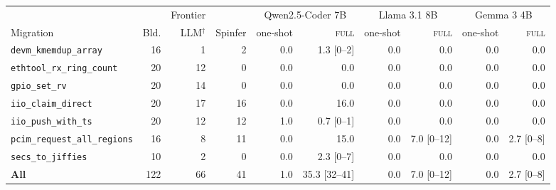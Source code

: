 \begin{tabular}{lrrrrrrrrr}
\toprule
 & & Frontier & & \multicolumn{2}{c}{Qwen2.5-Coder 7B} & \multicolumn{2}{c}{Llama 3.1 8B} & \multicolumn{2}{c}{Gemma 3 4B} \\
\cmidrule(lr){5-6}\cmidrule(lr){7-8}\cmidrule(lr){9-10}
Migration & Bld. & LLM$^\dagger$ & Spinfer & one-shot & \textsc{full} & one-shot & \textsc{full} & one-shot & \textsc{full} \\
\midrule
\texttt{devm\_kmemdup\_array} & 16 & 1 & 2 & 0.0 & 1.3 [0--2] & 0.0 & 0.0 & 0.0 & 0.0 \\
\texttt{ethtool\_rx\_ring\_count} & 20 & 12 & 0 & 0.0 & 0.0 & 0.0 & 0.0 & 0.0 & 0.0 \\
\texttt{gpio\_set\_rv} & 20 & 14 & 0 & 0.0 & 0.0 & 0.0 & 0.0 & 0.0 & 0.0 \\
\texttt{iio\_claim\_direct} & 20 & 17 & 16 & 0.0 & 16.0 & 0.0 & 0.0 & 0.0 & 0.0 \\
\texttt{iio\_push\_with\_ts} & 20 & 12 & 12 & 1.0 & 0.7 [0--1] & 0.0 & 0.0 & 0.0 & 0.0 \\
\texttt{pcim\_request\_all\_regions} & 16 & 8 & 11 & 0.0 & 15.0 & 0.0 & 7.0 [0--12] & 0.0 & 2.7 [0--8] \\
\texttt{secs\_to\_jiffies} & 10 & 2 & 0 & 0.0 & 2.3 [0--7] & 0.0 & 0.0 & 0.0 & 0.0 \\
\midrule
\textbf{All} & 122 & 66 & 41 & 1.0 & 35.3 [32--41] & 0.0 & 7.0 [0--12] & 0.0 & 2.7 [0--8] \\
\bottomrule
\end{tabular}
